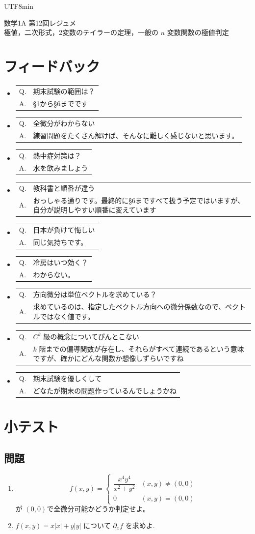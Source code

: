 \documentclass[a4paper,12pt]{article}
\makeatletter
\newcommand{\feedbackqa}[2]{%
\item[]
\begin{tabular}[t]{@{}p{1.8em}@{\hspace{0.4em}}p{\dimexpr\linewidth-2.2em\relax}@{}}
Q. & #1 \\
A. & #2
\end{tabular}
\par\smallskip\hrulefill
}
\makeatother
\begin{document}
\ifPDFTeX
\begin{CJK}{UTF8}{min}
\fi

\theoremstyle{definition}
\newtheorem*{definition}{定義}
\newtheorem*{theorem}{定理}
\newtheorem*{example}{例}
\newtheorem*{remark}{注意}
\renewcommand{\proofname}{\normalfont 証明}

\begin{center}
{\LARGE 数学1A 第12回レジュメ}\\[0.4em]
極値，二次形式，2変数のテイラーの定理，一般の $n$ 変数関数の極値判定
\end{center}

\section*{フィードバック}

\begin{itemize}[leftmargin=1.5em,itemsep=0.7em,topsep=0.3em]
\feedbackqa{期末試験の範囲は？}{§1から§6までです}
\feedbackqa{全微分がわからない}{練習問題をたくさん解けば、そんなに難しく感じないと思います。}
\feedbackqa{熱中症対策は？}{水を飲みましょう}
\feedbackqa{教科書と順番が違う}{おっしゃる通りです。最終的に§6まですべて扱う予定ではいますが、自分が説明しやすい順番に変えています}
\feedbackqa{日本が負けて悔しい}{同じ気持ちです。}
\feedbackqa{冷房はいつ効く？}{わからない。}
\feedbackqa{方向微分は単位ベクトルを求めている？}{求めているのは、指定したベクトル方向への微分係数なので、ベクトルではなく値です。}
\feedbackqa{$C^k$ 級の概念についてぴんとこない}{$k$ 階までの偏導関数が存在し、それらがすべて連続であるという意味ですが、確かにどんな関数か想像しずらいですね}
\feedbackqa{期末試験を優しくして}{どなたが期末の問題作っているんでしょうかね}
\end{itemize}

\section*{小テスト}

\subsection*{問題}

\begin{enumerate}
\item
$$
f(x,y) = \begin{cases}
    \dfrac{x^4 y^4}{x^2+y^2} & (x,y)\neq (0,0) \\
    0 & (x,y)=(0,0)
\end{cases}
$$
が $(0,0)$で全微分可能かどうか判定せよ。
\item
$f(x,y)=x|x|+y|y|$ について $\partial_x f$ を求めよ.
\end{enumerate}


\end{CJK}
\end{document}
